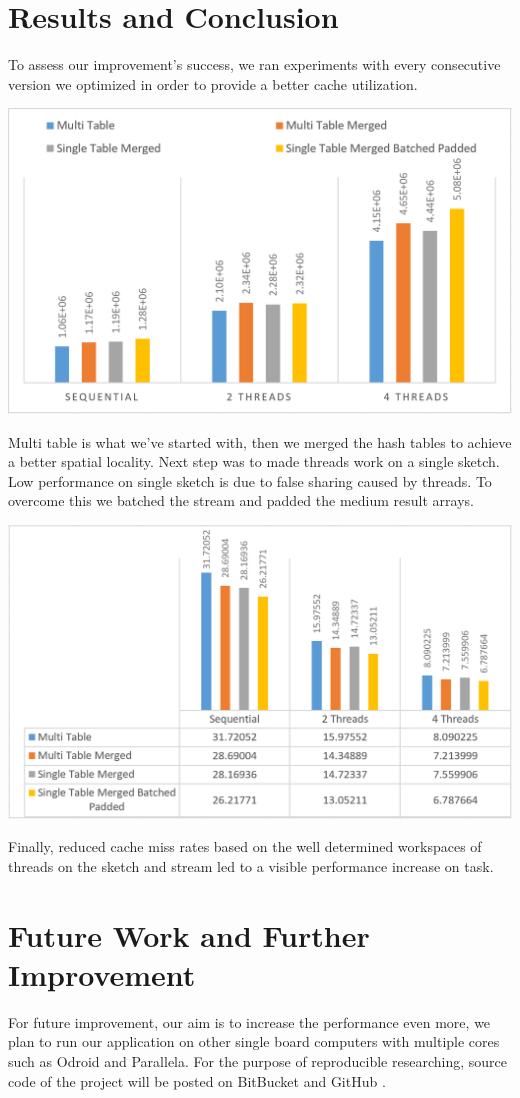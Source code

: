 \documentclass[twoside]{article}
\begin{document}
\section*{Results and Conclusion}
To assess our improvement's success, we ran experiments with every consecutive version we optimized in order to provide a better cache utilization.
\vspace{0.1cm}
\begin{center}
	\includegraphics[width=0.7\linewidth]{throughs2}
	\label{GIMlatlon}
\end{center}
Multi table is what we've started with, then we merged the hash tables to achieve a better spatial locality. Next step was to made threads work on a single sketch. Low performance on single sketch is due to false sharing caused by threads. To overcome this we batched the stream and padded the medium result arrays.
\vspace{0.1cm}
\begin{center}
	\includegraphics[width=0.7\linewidth]{times2}
	\label{GIMlatlon}
\end{center}
Finally, reduced cache miss rates based on the well determined workspaces of threads on the sketch and stream led to a visible performance increase on task.
\section*{Future Work and Further Improvement}
For future improvement, our aim is to increase the performance even more, we plan to run our application on other single board computers with multiple cores such as Odroid and Parallela. For the purpose of reproducible researching, source code of the project will be posted on BitBucket and GitHub .
\end{document}
